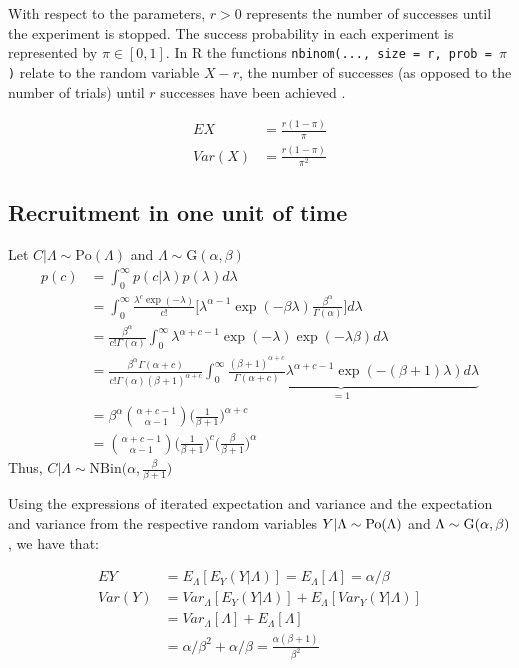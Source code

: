 With respect to the parameters, $r>0$ represents the number of successes until 
the experiment is stopped. The success probability in each experiment is 
represented by $\pi\in[0,1]$.  In R the functions \texttt{nbinom(..., size = r, prob = $\pi$)} relate to the random variable $X-r$, the number of successes (as opposed to the number of trials) until $r$ successes have been achieved \citep{held2014applied}. 

\begin{align*}
EX & = \frac{r(1-\pi)}{\pi}\\
Var(X) & = \frac{r(1-\pi)}{\pi^2}
\end{align*}


\subsection{Recruitment in one unit of time}
Let $C|\Lambda \sim \textrm{Po}(\Lambda)$ and $\Lambda \sim \textrm{G}(\alpha,\beta)$
\begin{align*}
p(c)&=\int^\infty_0 p(c|\lambda) p(\lambda) d\lambda\\
&=\int^\infty_0 \frac{\lambda^c\exp(-\lambda)}{c!}\Bigg[\lambda^{\alpha-1}\exp(-\beta\lambda)\frac{\beta^\alpha}{\Gamma(\alpha)}\Bigg]d\lambda\\
&=\frac{\beta^\alpha}{c!\Gamma(\alpha)}\int^\infty_0 \lambda^{\alpha+c-1}\exp(-\lambda)\exp(-\lambda\beta)d\lambda\\
&=\frac{\beta^\alpha\Gamma(\alpha+c)}{c!\Gamma(\alpha) (\beta+1)^{\alpha+c}}\underbrace{\int^\infty_0 \frac{(\beta+1)^{\alpha+c}}{\Gamma(\alpha+c)} \lambda^{\alpha+c-1}\exp(-(\beta+1)\lambda)d\lambda}_{=1}\\
&=\beta^\alpha\binom{\alpha+c-1}{\alpha-1}\Bigg (\frac{1}{\beta+1}\Bigg)^{\alpha+c}\\
&=\binom{\alpha+c-1}{\alpha-1}\Bigg (\frac{1}{\beta+1}\Bigg)^{c} \Bigg(\frac{\beta}{\beta+1}\Bigg)^{\alpha}
\end{align*}
Thus, $C|\Lambda\sim \textrm{NBin} \Bigg(\alpha, \frac{\beta}{\beta+1}\Bigg)$


\newpage

Using the expressions of iterated expectation and variance \citep{held2014applied} and the expectation and variance from the respective random variables $Y|\Lambda \sim \rm{Po}(\Lambda)$ and $\Lambda \sim \rm{G}(\alpha,\beta)$, we have that:

\begin{align*}
EY &= E_{\Lambda}[E_{Y} (Y|\Lambda)] = E_{\Lambda}[\Lambda] = \alpha/\beta \\
Var(Y) &= Var_{\Lambda}[E_{Y} (Y|\Lambda)] + E_{\Lambda}[Var_Y(Y|\Lambda)]\\
&=Var_{\Lambda}[\Lambda] + E_{\Lambda}[\Lambda] \\
&=\alpha/\beta^2 + \alpha/\beta = \frac{\alpha(\beta+1)}{\beta^2}
\end{align*}

